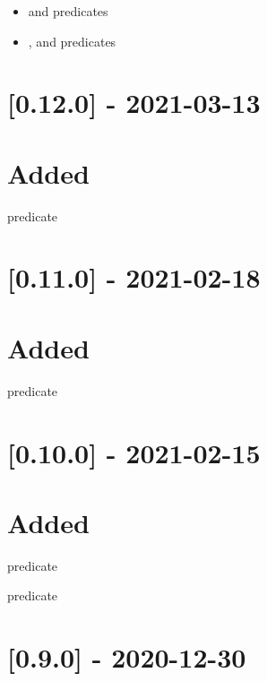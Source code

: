 \begin{itemize}
    \item {} and  predicates
    \item {},  and  predicates
\end{itemize}

\section{[0.12.0] - 2021-03-13}

\section{Added}

\begin{shortlist}
    \item {} predicate
\end{shortlist}

\section{[0.11.0] - 2021-02-18}

\section{Added}

\begin{shortlist}
    \item {} predicate
\end{shortlist}

\section{[0.10.0] - 2021-02-15}

\section{Added}

\begin{shortlist}
    \item {} predicate
    \item {} predicate
\end{shortlist}

\section{[0.9.0] - 2020-12-30}

